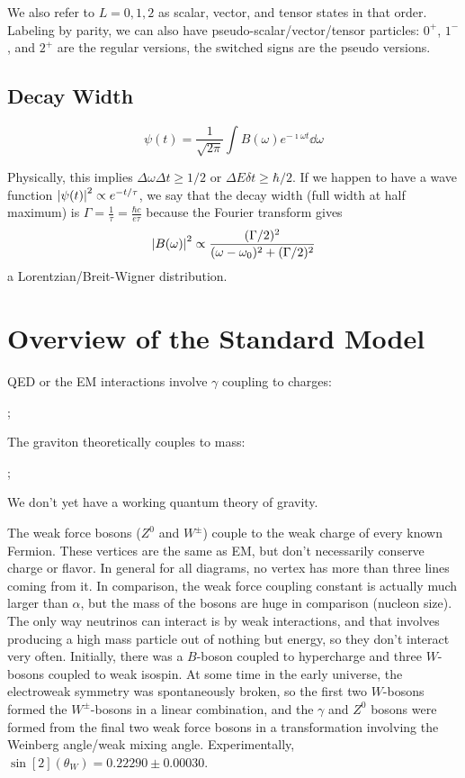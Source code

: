 \documentclass[a4paper,twoside,master.tex]{subfiles}
\begin{document}
We also refer to $ L = 0, 1, 2 $ as scalar, vector, and tensor states in that order. Labeling by parity, we can also have pseudo-scalar/vector/tensor particles: $ 0^+ $, $ 1^- $, and $ 2^+ $ are the regular versions, the switched signs are the pseudo versions.


\subsection{Decay Width}
\label{sub:decay_width}

\begin{equation}
    \psi(t) = \frac{1}{\sqrt{2 \pi}} \int B(\omega) e^{- \imath \omega t} \dd{\omega}
\end{equation}

Physically, this implies $ \Delta \omega \Delta t \geq 1/2 $ or $ \Delta E \delta t \geq \hbar / 2 $. If we happen to have a wave function $ \abs{\psi(t)}^2 \propto e^{-t/ \tau} $, we say that the decay width (full width at half maximum) is $ \Gamma = \frac{1}{\tau} = \frac{\hbar c}{e \tau} $ because the Fourier transform gives
\begin{equation}
    \abs{B(\omega)}^2 \propto \frac{(\Gamma / 2)^2}{(\omega - \omega_0)^2 + (\Gamma / 2)^2}
\end{equation}
a Lorentzian/Breit-Wigner distribution.


\section{Overview of the Standard Model}
\label{sec:overview_of_the_standard_model}

QED or the EM interactions involve $ \gamma $ coupling to charges:

;


The graviton theoretically couples to mass:

;

We don't yet have a working quantum theory of gravity.


The weak force bosons ($ Z^0 $ and $ W^{\pm} $) couple to the weak charge of every known Fermion. These vertices are the same as EM, but don't necessarily conserve charge or flavor. In general for all diagrams, no vertex has more than three lines coming from it. In comparison, the weak force coupling constant is actually much larger than $ \alpha $, but the mass of the bosons are huge in comparison (nucleon size). The only way neutrinos can interact is by weak interactions, and that involves producing a high mass particle out of nothing but energy, so they don't interact very often. Initially, there was a $ B $-boson coupled to hypercharge and three $ W $-bosons coupled to weak isospin. At some time in the early universe, the electroweak symmetry was spontaneously broken, so the first two $ W $-bosons formed the $ W^{\pm} $-bosons in a linear combination, and the $ \gamma $ and $ Z^0 $ bosons were formed from the final two weak force bosons in a transformation involving the Weinberg angle/weak mixing angle. Experimentally, $ \sin[2](\theta_W) = 0.22290\pm0.00030 $.
\end{document}
